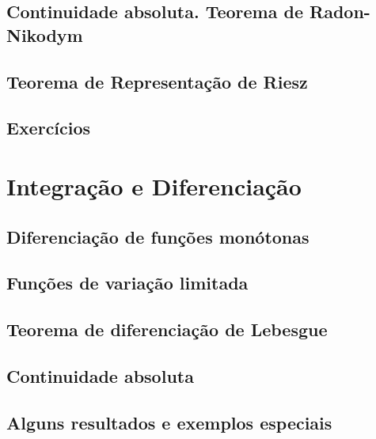 \documentclass[
]{book}
\begin{document}
\section{Continuidade absoluta. Teorema de Radon-Nikodym}\label{continuidade-absoluta.-teorema-de-radon-nikodym}

\section{Teorema de Representação de Riesz}\label{teorema-de-representauxe7uxe3o-de-riesz}

\section*{Exercícios}\label{exercuxedcios-6}

\chapter{Integração e Diferenciação}\label{integrauxe7uxe3o-e-diferenciauxe7uxe3o}

\section{Diferenciação de funções monótonas}\label{diferenciauxe7uxe3o-de-funuxe7uxf5es-monuxf3tonas}

\section{Funções de variação limitada}\label{funuxe7uxf5es-de-variauxe7uxe3o-limitada}

\section{Teorema de diferenciação de Lebesgue}\label{teorema-de-diferenciauxe7uxe3o-de-lebesgue}

\section{Continuidade absoluta}\label{continuidade-absoluta}

\section{Alguns resultados e exemplos especiais}\label{alguns-resultados-e-exemplos-especiais}
\end{document}
